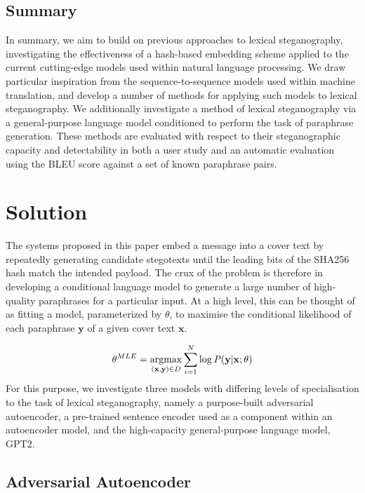 \documentclass[12pt,a4paper]{article}
\begin{document}

\subsection{Summary}

\noindent In summary, we aim to build on previous approaches to lexical steganography, investigating the effectiveness of a hash-based embedding scheme applied to the current cutting-edge models used within natural language processing. We draw particular inspiration from the sequence-to-sequence models used within machine translation, and develop a number of methods for applying such models to lexical steganography. We additionally investigate a method of lexical steganography via a general-purpose language model conditioned to perform the task of paraphrase generation. These methods are evaluated with respect to their steganographic capacity and detectability in both a user study and an automatic evaluation using the BLEU score against a set of known paraphrase pairs.
\section{Solution}
\noindent The systems proposed in this paper embed a message into a cover text by repeatedly generating candidate stegotexts until the leading bits of the SHA256 hash match the intended payload. The crux of the problem is therefore in developing a conditional language model to generate a large number of high-quality paraphrases for a particular input. At a high level, this can be thought of as fitting a model, parameterized by $\theta$, to maximise the conditional likelihood of each paraphrase $\mathbf{y}$ of a given cover text $\mathbf{x}$.

\begin{equation}
  \theta^{MLE} = \operatornamewithlimits{argmax}_{(\mathbf{x},\mathbf{y}) \in D}{\sum_{i=1}^{N}\log \mathit{P}(\mathbf{y} |\mathbf{x}; \theta)}
\vspace{2mm}
\end{equation}
\noindent For this purpose, we investigate three models with differing levels of specialisation to the task of lexical steganography, namely a purpose-built adversarial autoencoder, a pre-trained sentence encoder used as a component within an autoencoder model, and the high-capacity general-purpose language model, GPT2.

\subsection{Adversarial Autoencoder}
\end{document}
